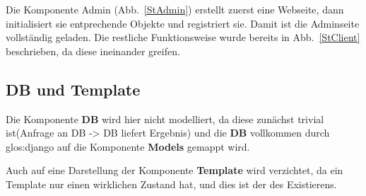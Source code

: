 Die Komponente Admin (Abb.\ \ref{StAdmin}) erstellt zuerst eine Webseite, dann 
initialisiert sie entprechende Objekte und registriert sie. Damit ist die 
Adminseite vollständig geladen. Die restliche Funktionsweise wurde bereits in 
Abb.\ \ref{StClient} beschrieben, da diese ineinander greifen.


\subsection{DB und Template}
Die Komponente \textbf{DB} wird hier nicht modelliert, da diese zunächst trivial
 ist(Anfrage an DB -> DB liefert Ergebnis) und die \textbf{DB} vollkommen durch 
 \gls{glos:django} auf die Komponente \textbf{Models} gemappt wird.

Auch auf eine Darstellung der Komponente \textbf{Template} wird verzichtet, da 
ein Template nur einen wirklichen Zustand hat, und dies ist der des Existierens. 






